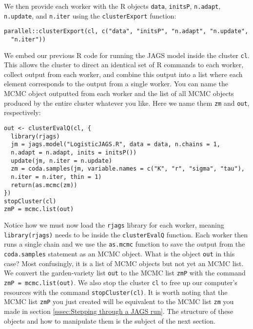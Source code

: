 \documentclass[12pt,english]{article}
\begin{document}
We then provide each worker with the R objects \texttt{data}, \texttt{initsP}, \texttt{n.adapt}, \texttt{n.update}, and \texttt{n.iter} using the \texttt{clusterExport} function:

\begin{Verbatim}
parallel::clusterExport(cl, c("data", "initsP", "n.adapt", "n.update",
  "n.iter"))
\end{Verbatim}

\noindent We embed our previous R code for running the JAGS model inside the cluster \texttt{cl}. This allows the cluster to direct an identical set of R commands to each worker, collect output from each worker, and combine this output into a list where each element corresponds to the output from a single worker. You can name the MCMC object outputted from each worker and the list of all MCMC objects produced by the entire cluster whatever you like. Here we name them \texttt{zm} and \texttt{out}, respectively:

\begin{Verbatim}
out <- clusterEvalQ(cl, {
  library(rjags)
  jm = jags.model("LogisticJAGS.R", data = data, n.chains = 1, 
  n.adapt = n.adapt, inits = initsP())
  update(jm, n.iter = n.update)
  zm = coda.samples(jm, variable.names = c("K", "r", "sigma", "tau"), 
  n.iter = n.iter, thin = 1)
  return(as.mcmc(zm))
}) 
stopCluster(cl)
zmP = mcmc.list(out)
\end{Verbatim}

\noindent Notice how we must now load the \texttt{rjags} library for each worker, meaning \texttt{library(rjags)} needs to be inside the \texttt{clusterEvalQ} function. Each worker then runs a single chain and we use the \texttt{as.mcmc} function to save the output from the \texttt{coda.samples} statement as an MCMC object. What is the object \texttt{out} in this case? Most confusingly, it is a list of MCMC objects but not yet an MCMC list. We convert the garden-variety list \texttt{out} to the MCMC list \texttt{zmP} with the command \texttt{zmP = mcmc.list(out)}.  We also stop the cluster \texttt{cl} to free up our computer's resources with the command \texttt{stopCluster(cl)}. It is worth noting that the MCMC list \texttt{zmP} you just created will be equivalent to the MCMC list \texttt{zm} you made in section \ref{sssec:Stepping through a JAGS run}. The structure of these objects and how to manipulate them is the subject of the next section.
\end{document}
